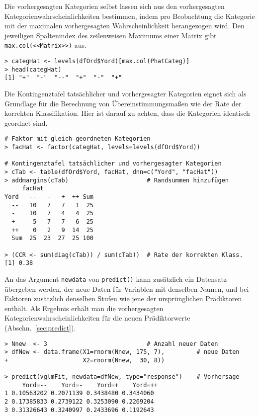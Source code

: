 Die vorhergesagten Kategorien selbst lassen sich aus den vorhergesagten Kategorienwahrscheinlichkeiten bestimmen, indem pro Beobachtung die Kategorie mit der maximalen vorhergesagten Wahrscheinlichkeit herangezogen wird. Den jeweiligen Spaltenindex des zeilenweisen Maximums einer Matrix gibt \lstinline!max.col(<<Matrix>>)! aus.
\begin{lstlisting}
> categHat <- levels(dfOrd$Yord)[max.col(PhatCateg)]
> head(categHat)
[1] "+"  "-"  "--"  "+"  "-"  "+"
\end{lstlisting}

Die Kontingenztafel tatsächlicher und vorhergesagter Kategorien eignet sich als Grundlage für die Berechnung von Übereinstimmungsmaßen wie der Rate der korrekten Klassifikation. Hier ist darauf zu achten, dass die Kategorien identisch geordnet sind.
\begin{lstlisting}
# Faktor mit gleich geordneten Kategorien
> facHat <- factor(categHat, levels=levels(dfOrd$Yord))

# Kontingenztafel tatsächlicher und vorhergesagter Kategorien
> cTab <- table(dfOrd$Yord, facHat, dnn=c("Yord", "facHat"))
> addmargins(cTab)                      # Randsummen hinzufügen
     facHat
Yord   --   -   +  ++ Sum
  --   10   7   7   1  25
  -    10   7   4   4  25
  +     5   7   7   6  25
  ++    0   2   9  14  25
  Sum  25  23  27  25 100

> (CCR <- sum(diag(cTab)) / sum(cTab))  # Rate der korrekten Klass.
[1] 0.38
\end{lstlisting}

An das Argument \lstinline!newdata! von \lstinline!predict()! kann zusätzlich ein Datensatz übergeben werden, der neue Daten für Variablen mit denselben Namen, und bei Faktoren zusätzlich denselben Stufen wie jene der ursprünglichen Prädiktoren enthält. Als Ergebnis erhält man die vorhergesagten Kategorienwahrscheinlichkeiten für die neuen Prädiktorwerte (Abschn.\ \ref{sec:predict}).
\begin{lstlisting}
> Nnew  <- 3                            # Anzahl neuer Daten
> dfNew <- data.frame(X1=rnorm(Nnew, 175, 7),         # neue Daten
+                     X2=rnorm(Nnew,  30, 8))

> predict(vglmFit, newdata=dfNew, type="response")    # Vorhersage
     Yord=--    Yord=-    Yord=+    Yord=++
1 0.10563202 0.2071139 0.3438480 0.3434060
2 0.17385833 0.2739122 0.3253090 0.2269204
3 0.31326643 0.3240997 0.2433696 0.1192643
\end{lstlisting}


